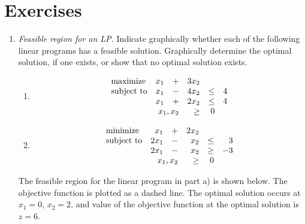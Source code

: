\section{Exercises}
\begin{enumerate}

\item \emph{Feasible region for an LP.} Indicate graphically whether each of the following
  linear programs has a feasible solution. Graphically determine the
  optimal solution, if one exists, or show that no optimal solution
  exists.

\begin{enumerate}
\item
\[
  \begin{array}{lrrrrr}
    \textrm{maximize}   & x_1& +& 3x_2&  & \\
    \textrm{subject to} & x_1& -&4x_2& \leq & 4  \\
                        & x_1& +& 2x_2& \leq & 4 \\
    \multicolumn{3}{r}{x_1,x_2}&       \geq & 0 
  \end{array}
\]

\item
\[
  \begin{array}{lrrrrr}
    \textrm{minimize}   & x_1& +& 2x_2&  & \\
    \textrm{subject to} & 2x_1& -&x_2& \leq & 3  \\
                        & 2x_1& -& x_2& \geq & -3 \\
    \multicolumn{3}{r}{x_1,x_2}&       \geq & 0 
  \end{array}
\]

\end{enumerate}

\begin{solution}
\bs The feasible region for the linear program in part a) is shown
below. The objective function is plotted as a dashed line. The
optimal solution occurs at $x_1=0$, $x_2=2$, and value of the
objective function at the optimal solution is $z=6$.

\begin{center}
\end{center}
\end{solution}
\end{enumerate}
